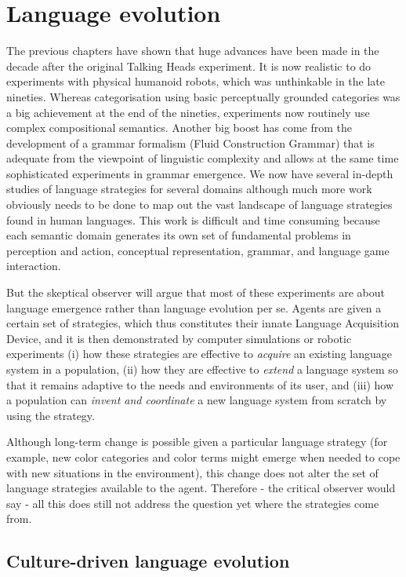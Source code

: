 \chapter{Language evolution}
\label{c:evolution}

The previous chapters have shown that huge advances have been made in the decade after the original Talking Heads experiment. 
It is now realistic to do experiments with physical humanoid robots, which was unthinkable 
in the late nineties. Whereas categorisation using 
basic perceptually grounded categories was a big achievement at the end of the nineties, experiments now routinely use 
complex compositional semantics. Another big boost has come from the development of a grammar formalism
(Fluid Construction Grammar) that is adequate from the viewpoint of linguistic complexity and allows at the same time
sophisticated experiments in grammar emergence. We now have several in-depth studies of language strategies for several 
domains although much more work obviously needs to be done to map out the vast landscape of language strategies found in 
human languages. This work is difficult and time consuming because each semantic domain generates its own set of fundamental 
problems in perception and action, conceptual representation, grammar, and language game interaction. 

But the skeptical observer will argue that most of these experiments are about language emergence rather than 
language evolution per se. Agents are given a certain set of strategies, which thus constitutes their 
innate Language Acquisition Device, and it is then demonstrated by computer simulations or 
robotic experiments (i) how these strategies are effective to {\itshape acquire} an existing language system in a 
population, (ii) how they are effective to {\itshape extend} a language system so that it remains adaptive 
to the needs and environments of its user, and (iii) how a population can {\itshape invent and coordinate} a new language system from 
scratch by using the strategy. 

Although long-term change is possible
given a particular language strategy (for example, new color categories and color terms might emerge
when needed to cope with new situations in the environment), this change does not alter
the set of language strategies available to the agent. Therefore - the critical observer would say - all this does still
not address the question yet where the strategies come from. 

\section{Culture-driven language evolution}

